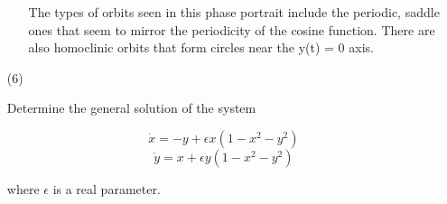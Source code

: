 \documentclass[12pt,letterpaper,reqno]{amsart}
\begin{document}
\begin{enumerate}
\begin{flushleft}
\begin{enumerate}
    \begin{flushleft}
    The types of orbits seen in this phase portrait include the periodic, saddle ones that seem to mirror the periodicity of the cosine function. There are also homoclinic orbits that form circles near the y(t) = 0 axis.
    \end{flushleft}
    
\end{enumerate} 
\end{flushleft}
\newpage
\item[(6)]
\begin{flushleft}
Determine the general solution of the system

$$\dot{x} = -y + \epsilon x(1 - x^2 - y^2)$$
$$\dot{y} = x + \epsilon y(1 - x^2 - y^2)$$

where $\epsilon$ is a real parameter.
\newline


\end{flushleft}
\end{enumerate}
\end{document}
